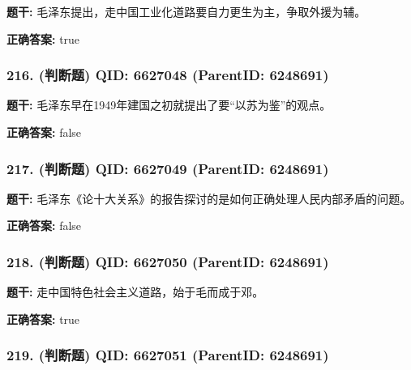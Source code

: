 \documentclass[12pt,UTF8]{ctexart}
\begin{document}
\textbf{题干:}
毛泽东提出，走中国工业化道路要自力更生为主，争取外援为辅。



\textbf{正确答案:}
true

\vspace{0.3em}\hrulefill\vspace{0.7em}

\subsubsection*{216. (判断题) \small QID: 6627048 (ParentID: 6248691)}

\textbf{题干:}
毛泽东早在1949年建国之初就提出了要“以苏为鉴”的观点。



\textbf{正确答案:}
false

\vspace{0.3em}\hrulefill\vspace{0.7em}

\subsubsection*{217. (判断题) \small QID: 6627049 (ParentID: 6248691)}

\textbf{题干:}
毛泽东《论十大关系》的报告探讨的是如何正确处理人民内部矛盾的问题。



\textbf{正确答案:}
false

\vspace{0.3em}\hrulefill\vspace{0.7em}

\subsubsection*{218. (判断题) \small QID: 6627050 (ParentID: 6248691)}

\textbf{题干:}
走中国特色社会主义道路，始于毛而成于邓。



\textbf{正确答案:}
true

\vspace{0.3em}\hrulefill\vspace{0.7em}

\subsubsection*{219. (判断题) \small QID: 6627051 (ParentID: 6248691)}
\end{document}
